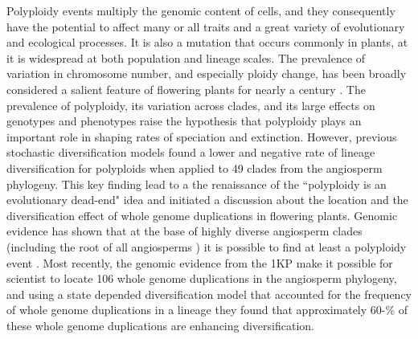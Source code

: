 Polyploidy events multiply the genomic content of cells, and they consequently have the potential to affect many or all traits and a great variety of evolutionary \citep{ramsey_2002} and ecological processes\citep{sessa_2019}.
It is also a mutation that occurs commonly in plants, at it is widespread at both population and lineage scales\citep{husband_2013, zenil_2017}.
The prevalence of variation in chromosome number, and especially ploidy change, has been broadly considered a salient feature of flowering plants for nearly a century \citep{stebbins1938}. %
The prevalence of polyploidy, its variation across clades, and its large effects on genotypes and phenotypes raise the hypothesis that polyploidy plays an important role in shaping rates of speciation and extinction.
However,  previous stochastic diversification models found a lower and negative rate of lineage diversification for polyploids \citet{mayrose_2011, mayrose_2015} when applied to 49 clades from the angiosperm phylogeny. 
This key finding lead to a the renaissance of the ``polyploidy is an evolutionary dead-end" idea and initiated a discussion about the location and the diversification effect of  whole genome duplications in flowering plants. 
Genomic evidence has shown that at the base of highly diverse  angiosperm clades (including  the root of all angiosperms \citep{jiao_2011}) it is possible to find at least a polyploidy event  \citet{soltis_2014}. Most recently, the genomic evidence  from the 1KP make it possible for scientist to locate 106  whole genome duplications in the angiosperm phylogeny, and using a state depended diversification model that accounted for  the frequency of whole genome duplications in a lineage  they found that approximately 60-\%  of these  whole genome duplications are enhancing diversification\citep{landis_2018}. %

